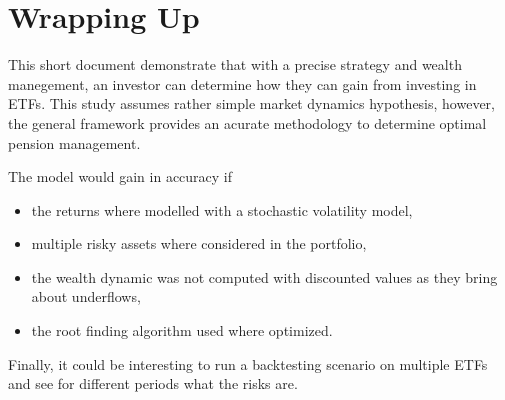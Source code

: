 \documentclass{article}
\begin{document}
\section{Wrapping Up}

This short document demonstrate that with a precise strategy and wealth manegement, an investor can determine how they can gain from investing in ETFs. This study assumes rather simple market dynamics hypothesis, however, the general framework provides an acurate methodology to determine optimal pension management.

The model would gain in accuracy if
\begin{itemize}
\item the returns where modelled with a stochastic volatility model,
\item multiple risky assets where considered in the portfolio,
\item the wealth dynamic was not computed with discounted values as they bring about underflows,
\item the root finding algorithm used where optimized.
\end{itemize}

Finally, it could be interesting to run a backtesting scenario on multiple ETFs and see for different periods what the risks are.
\end{document}
